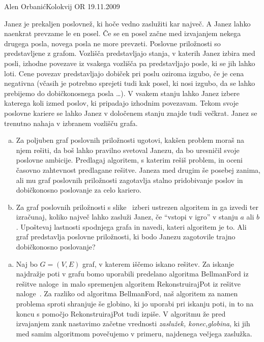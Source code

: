 \begin{naloga}{Alen Orbanić}{Kolokvij OR 19.11.2009}
\begin{vprasanje}
Janez je prekaljen poslovnež, ki hoče vedno zaslužiti kar največ.
A Janez lahko naenkrat prevzame le en posel.
Če se en posel začne med izvajanjem nekega drugega posla,
novega posla ne more prevzeti.
Poslovne priložnosti so predstavljene z grafom.
Vozlišča predstavljajo stanja, v katerih Janez izbira med posli,
izhodne povezave iz vsakega vozlišča pa predstavljajo posle,
ki se jih lahko loti.
Cene povezav predstavljajo dobiček pri poslu oziroma izgubo,
če je cena negativna
(včasih je potrebno sprejeti tudi kak posel, ki nosi izgubo,
da se lahko prebijemo do dobičkonosnega posla \dots).
V vsakem stanju lahko Janez izbere katerega koli izmed poslov,
ki pripadajo izhodnim povezavam.
Tekom svoje poslovne kariere se lahko Janez
v določenem stanju znajde tudi večkrat.
Janez se trenutno nahaja v izbranem vozlišču grafa.
\begin{enumerate}[(a)]
\item Za poljuben graf poslovnih priložnosti ugotovi,
kakšen problem moraš na njem rešiti, da boš lahko pravilno svetoval Janezu,
da bo uresničil svoje poslovne ambicije.
Predlagaj algoritem, s katerim rešiš problem,
in oceni časovno zahtevnost predlagane rešitve.
Janeza med drugim še posebej zanima,
ali mu graf poslovnih priložnosti zagotavlja stalno pridobivanje poslov
in dobičkonosno poslovanje za celo kariero.
\item Za graf poslovnih priložnosti s slike~\fig
izberi ustrezen algoritem in ga izvedi ter izračunaj,
koliko največ lahko zasluži Janez, če ``vstopi v igro'' v stanju $a$ ali $b$.
Upoštevaj lastnosti spodnjega grafa in navedi, kateri algoritem je to.
Ali graf predstavlja poslovne priložnosti,
ki bodo Janezu zagotovile trajno dobičkonosno poslovanje?
\end{enumerate}

\begin{slika}
\pgfslika
{}
\end{slika}
\end{vprasanje}
\begin{odgovor}
\begin{enumerate}[(a)]
\item Naj bo $G=(V,E)$ graf, v katerem iščemo iskano rešitev. Za iskanje najdražje poti 
v grafu bomo uporabili predelano algoritma {\sc BellmanFord} iz rešitve naloge~\res[bf] 
in malo spremenjen algoritem {\sc RekonstruirajPot} iz rešitve naloge~\res[topo]. Za 
razliko od algoritma {\sc BellmanFord}, naš algoritem za namen problema sproti shranjuje
še globino, ki jo uporabi pri iskanju poti, in to na koncu s pomočjo {\sc RekonstruirajPot}
tudi izpiše. V algoritmu že pred izvajanjem zank nastavimo začetne vrednosti \textit{zaslužek,
konec,globina}, ki jih med samim algoritmom povečujemo v primeru, najdenega večjega zaslužka.



\end{enumerate}
\end{odgovor}
\end{naloga}
